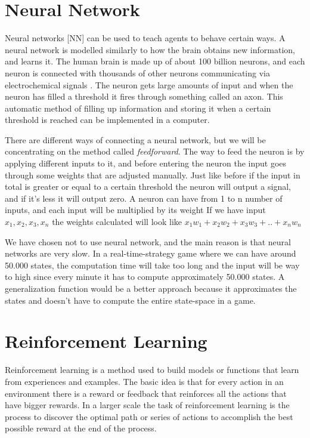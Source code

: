 \section{Neural Network}			 
			
Neural networks [NN] can be used to teach agents to behave certain ways.
A neural network is modelled similarly to how the brain obtains new information, and learns it. The human brain is made up of about 100 billion neurons, and each neuron is connected with thousands of other neurons communicating via electrochemical signals \cite{nn}. The neuron gets large amounts of input and when the neuron has filled a threshold it fires through something called an axon. This automatic method of filling up information and storing it when a certain threshold is reached can be implemented in a computer.

There are different ways of connecting a neural network, but we will be concentrating on the method called \textit{feedforward}. The way to feed the neuron is by applying different inputs to it, and before entering the neuron the input goes through some weights that are adjusted manually. Just like before if the input in total is greater or equal to a certain threshold the neuron will output a signal, and if it's less it will output zero.
A neuron can have from 1 to n number of inputs, and each input will be multiplied by its weight
If we have input $x_1, x_2, x_3, x_n$ the weights calculated will look like $x_1 w_1 + x_2 w_2 + x_3 w_3 + .. +  x_n w_n$


We have chosen not to use neural network, and the main reason is that neural networks are very slow. In a real-time-strategy game where we can have around 50.000 states, the computation time will take too long and the input will be way to high since every minute it has to compute approximately 50.000 states. A generalization function would be a better approach because it approximates the states and doesn't have to compute the entire state-space in a game. 


\section{Reinforcement Learning}

	Reinforcement learning is a method used to build models or functions that learn from experiences and examples. The basic idea is that for every action in an environment there is a reward or feedback that reinforces all the actions that have bigger rewards. In a larger scale the task of reinforcement learning is the process to discover the optimal path or series of actions to accomplish the best possible reward at the end of the process. 

